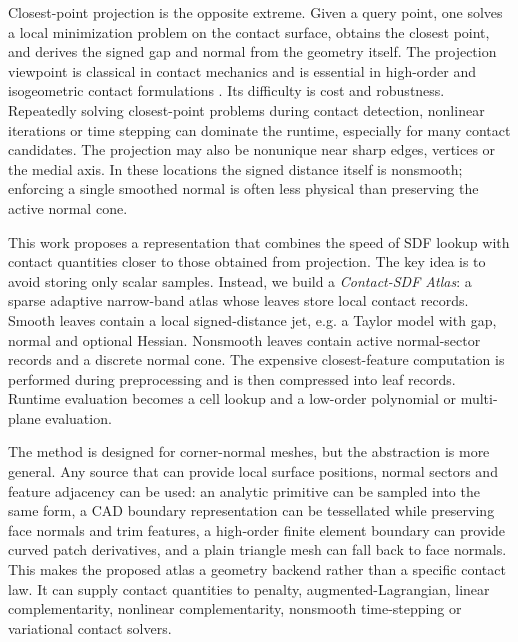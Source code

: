 \documentclass[preprint,12pt,sort&compress]{elsarticle}
\begin{document}
Closest-point projection is the opposite extreme. Given a query point, one solves a local minimization problem on the contact surface, obtains the closest point, and derives the signed gap and normal from the geometry itself. The projection viewpoint is classical in contact mechanics and is essential in high-order and isogeometric contact formulations \cite{Konyukhov2008,Lu2011,Temizer2011}. Its difficulty is cost and robustness. Repeatedly solving closest-point problems during contact detection, nonlinear iterations or time stepping can dominate the runtime, especially for many contact candidates. The projection may also be nonunique near sharp edges, vertices or the medial axis. In these locations the signed distance itself is nonsmooth; enforcing a single smoothed normal is often less physical than preserving the active normal cone.

This work proposes a representation that combines the speed of SDF lookup with contact quantities closer to those obtained from projection. The key idea is to avoid storing only scalar samples. Instead, we build a \emph{Contact-SDF Atlas}: a sparse adaptive narrow-band atlas whose leaves store local contact records. Smooth leaves contain a local signed-distance jet, e.g. a Taylor model with gap, normal and optional Hessian. Nonsmooth leaves contain active normal-sector records and a discrete normal cone. The expensive closest-feature computation is performed during preprocessing and is then compressed into leaf records. Runtime evaluation becomes a cell lookup and a low-order polynomial or multi-plane evaluation.

The method is designed for corner-normal meshes, but the abstraction is more general. Any source that can provide local surface positions, normal sectors and feature adjacency can be used: an analytic primitive can be sampled into the same form, a CAD boundary representation can be tessellated while preserving face normals and trim features, a high-order finite element boundary can provide curved patch derivatives, and a plain triangle mesh can fall back to face normals. This makes the proposed atlas a geometry backend rather than a specific contact law. It can supply contact quantities to penalty, augmented-Lagrangian, linear complementarity, nonlinear complementarity, nonsmooth time-stepping or variational contact solvers.
\end{document}

